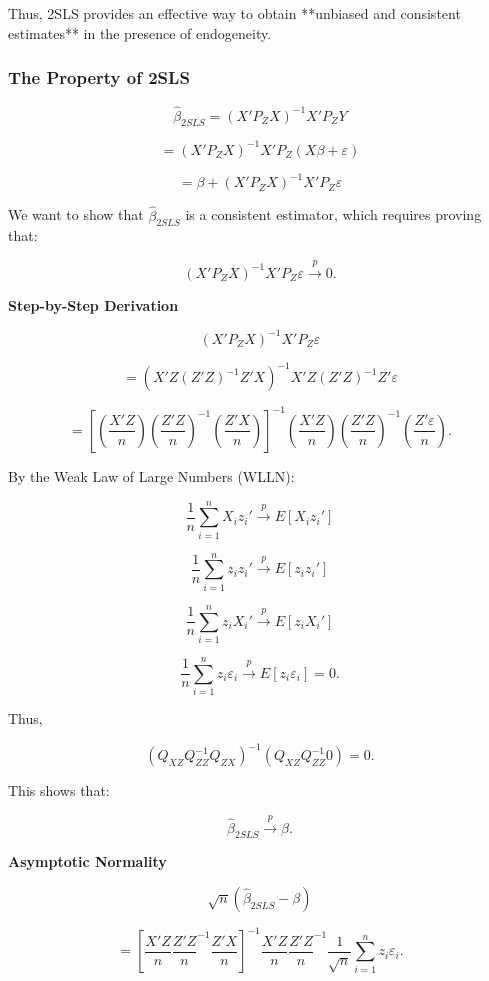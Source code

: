 \documentclass[12pt, oneside]{article}
\begin{document}
Thus, 2SLS provides an effective way to obtain **unbiased and consistent estimates** in the presence of endogeneity.

\subsubsection{The Property of 2SLS}

\[
\hat{\beta}_{2SLS} = (X'P_Z X)^{-1} X'P_Z Y
\]

\[
= (X'P_Z X)^{-1} X'P_Z (X \beta + \varepsilon)
\]

\[
= \beta + (X'P_Z X)^{-1} X' P_Z \varepsilon
\]

We want to show that \( \hat{\beta}_{2SLS} \) is a consistent estimator, which requires proving that:

\[
(X'P_Z X)^{-1} X' P_Z \varepsilon \xrightarrow{p} 0.
\]

\textbf*{Step-by-Step Derivation}

\[
(X'P_Z X)^{-1} X' P_Z \varepsilon
\]

\[
= (X'Z (Z'Z)^{-1} Z'X)^{-1} X' Z (Z'Z)^{-1} Z' \varepsilon
\]

\[
= \left[ \left( \frac{X'Z}{n} \right) \left( \frac{Z'Z}{n} \right)^{-1} \left( \frac{Z'X}{n} \right) \right]^{-1} 
\left( \frac{X'Z}{n} \right) \left( \frac{Z'Z}{n} \right)^{-1} \left( \frac{Z' \varepsilon}{n} \right).
\]

By the Weak Law of Large Numbers (WLLN):

\[
\frac{1}{n} \sum_{i=1}^{n} X_i z_i' \xrightarrow{p} E[X_i z_i']
\]

\[
\frac{1}{n} \sum_{i=1}^{n} z_i z_i' \xrightarrow{p} E[z_i z_i']
\]

\[
\frac{1}{n} \sum_{i=1}^{n} z_i X_i' \xrightarrow{p} E[z_i X_i']
\]

\[
\frac{1}{n} \sum_{i=1}^{n} z_i \varepsilon_i \xrightarrow{p} E[z_i \varepsilon_i] = 0.
\]

Thus,

\[
(Q_{XZ} Q_{ZZ}^{-1} Q_{ZX})^{-1} (Q_{XZ} Q_{ZZ}^{-1} 0) = 0.
\]

This shows that:

\[
\hat{\beta}_{2SLS} \xrightarrow{p} \beta.
\]

\textbf*{Asymptotic Normality}

\[
\sqrt{n} (\hat{\beta}_{2SLS} - \beta)
\]

\[
= \left[ \frac{X'Z}{n} \frac{Z'Z}{n}^{-1} \frac{Z'X}{n} \right]^{-1} \frac{X'Z}{n} \frac{Z'Z}{n}^{-1} \frac{1}{\sqrt{n}} \sum_{i=1}^{n} z_i \varepsilon_i.
\]
\end{document}

